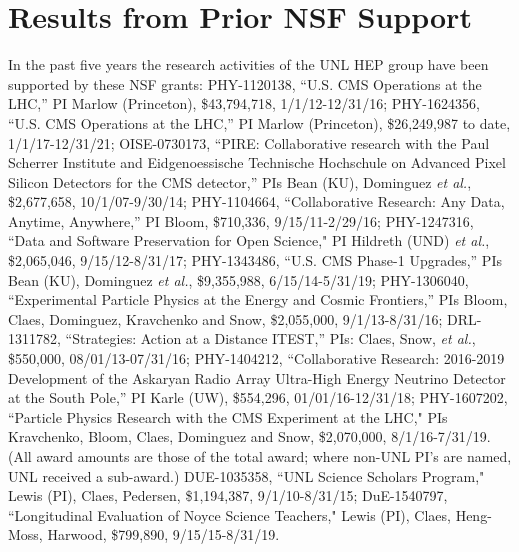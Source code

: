 \section{Results from Prior NSF Support}
\label{sec:prior}

In the past five years the research activities of the UNL HEP group have been supported by these NSF grants: 
PHY-1120138, ``U.S. CMS Operations at the LHC,'' PI Marlow (Princeton), \$43,794,718, 1/1/12-12/31/16; 
PHY-1624356, ``U.S. CMS Operations at the LHC,'' PI Marlow (Princeton), \$26,249,987 to date, 1/1/17-12/31/21; 
OISE-0730173, ``PIRE: Collaborative research with the Paul Scherrer Institute and Eidgenoessische Technische Hochschule on Advanced Pixel Silicon Detectors for the CMS detector,'' PIs Bean (KU), Dominguez {\it et al.}, \$2,677,658, 10/1/07-9/30/14; 
PHY-1104664, ``Collaborative Research: Any Data, Anytime, Anywhere,'' PI Bloom, \$710,336, 9/15/11-2/29/16;
PHY-1247316, ``Data and Software Preservation for Open Science," PI Hildreth (UND) {\it et al.}, \$2,065,046, 9/15/12-8/31/17;
PHY-1343486, ``U.S. CMS Phase-1 Upgrades,'' PIs Bean (KU), Dominguez {\it et al.}, \$9,355,988, 6/15/14-5/31/19;
PHY-1306040, ``Experimental Particle Physics at the Energy and Cosmic Frontiers,'' PIs Bloom, Claes, Dominguez, Kravchenko and Snow, \$2,055,000, 9/1/13-8/31/16;
DRL-1311782, ``Strategies: Action at a Distance ITEST,'' PIs: Claes, Snow, {\it et al.}, \$550,000, 08/01/13-07/31/16;
PHY-1404212, ``Collaborative Research: 2016-2019 Development of the Askaryan Radio Array Ultra-High Energy Neutrino Detector at the South Pole,'' PI Karle (UW), \$554,296, 01/01/16-12/31/18;
PHY-1607202, ``Particle Physics Research with the CMS Experiment at the LHC," PIs Kravchenko, Bloom, Claes, Dominguez and Snow, \$2,070,000, 8/1/16-7/31/19.
(All award amounts are those of the total award; where non-UNL PI's are named, UNL received a sub-award.)
DUE-1035358, ``UNL Science Scholars Program," Lewis (PI), Claes, Pedersen, \$1,194,387, 9/1/10-8/31/15; DuE-1540797, ``Longitudinal Evaluation of Noyce Science Teachers," Lewis (PI), Claes, Heng-Moss, Harwood, \$799,890, 9/15/15-8/31/19.

